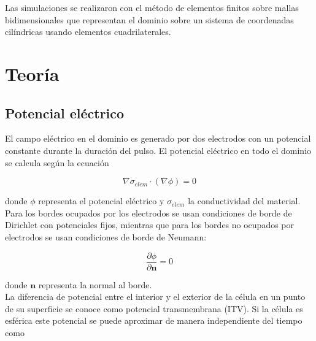 \documentclass[a4paper,10pt]{article}
\begin{document}

Las simulaciones se realizaron con el método de elementos finitos sobre mallas bidimensionales que representan el dominio sobre un sistema de coordenadas cilíndricas usando elementos cuadrilaterales.



\clearpage
\section{Teoría}

\subsection{Potencial eléctrico}

El campo eléctrico en el dominio es generado por dos electrodos con un potencial constante durante la duración del pulso. El potencial eléctrico en todo el dominio se calcula según la ecuación 

\begin{equation} \label{eq:poisson}
	\nabla \sigma_{elem} \cdot (\nabla \phi) = 0 
\end{equation}

donde $\phi$ representa el potencial eléctrico y $\sigma_{elem}$ la conductividad del material. \\

Para los bordes ocupados por los electrodos se usan condiciones de borde de Dirichlet con potenciales fijos, mientras que para los bordes no ocupados por electrodos se usan condiciones de borde de Neumann:

\begin{equation}
	\frac{\partial \phi}{\partial \mathbf{n}} = 0
\end{equation}

donde $\mathbf{n}$ representa la normal al borde.\\

La diferencia de potencial entre el interior y el exterior de la célula en un punto de su superficie se conoce como potencial transmembrana (ITV). Si la célula es esférica este potencial se puede aproximar de manera independiente del tiempo como
\end{document}
